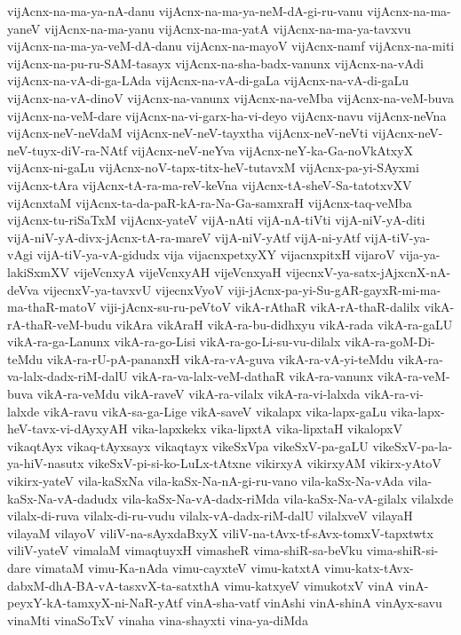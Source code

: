 {vijAcnx-na-ma-ya-nA-danu
vijAcnx-na-ma-ya-neM-dA-gi-ru-vanu
vijAcnx-na-ma-yaneV
vijAcnx-na-ma-yanu
vijAcnx-na-ma-yatA
vijAcnx-na-ma-ya-tavxvu
vijAcnx-na-ma-ya-veM-dA-danu
vijAcnx-na-mayoV
vijAcnx-namf
vijAcnx-na-miti
vijAcnx-na-pu-ru-SAM-tasayx
vijAcnx-na-sha-badx-vanunx
vijAcnx-na-vAdi
vijAcnx-na-vA-di-ga-LAda
vijAcnx-na-vA-di-gaLa
vijAcnx-na-vA-di-gaLu
vijAcnx-na-vA-dinoV
vijAcnx-na-vanunx
vijAcnx-na-veMba
vijAcnx-na-veM-buva
vijAcnx-na-veM-dare
vijAcnx-na-vi-garx-ha-vi-deyo
vijAcnx-navu
vijAcnx-neVna
vijAcnx-neV-neVdaM
vijAcnx-neV-neV-tayxtha
vijAcnx-neV-neVti
vijAcnx-neV-neV-tuyx-diV-ra-NAtf
vijAcnx-neV-neYva
vijAcnx-neY-ka-Ga-noVkAtxyX
vijAcnx-ni-gaLu
vijAcnx-noV-tapx-titx-heV-tutavxM
vijAcnx-pa-yi-SAyxmi
vijAcnx-tAra
vijAcnx-tA-ra-ma-reV-keVna
vijAcnx-tA-sheV-Sa-tatotxvXV
vijAcnxtaM
vijAcnx-ta-da-paR-kA-ra-Na-Ga-samxraH
vijAcnx-taq-veMba
vijAcnx-tu-riSaTxM
vijAcnx-yateV
vijA-nAti
vijA-nA-tiVti
vijA-niV-yA-diti
vijA-niV-yA-divx-jAcnx-tA-ra-mareV
vijA-niV-yAtf
vijA-ni-yAtf
vijA-tiV-ya-vAgi
vijA-tiV-ya-vA-gidudx
vija
vijacnxpetxyXY
vijacnxpitxH
vijaroV
vija-ya-lakiSxmXV
vijeVcnxyA
vijeVcnxyAH
vijeVcnxyaH
vijecnxV-ya-satx-jAjxcnX-nA-deVva
vijecnxV-ya-tavxvU
vijecnxVyoV
viji-jAcnx-pa-yi-Su-gAR-gayxR-mi-ma-ma-thaR-matoV
viji-jAcnx-su-ru-peVtoV
vikA-rAthaR
vikA-rA-thaR-dalilx
vikA-rA-thaR-veM-budu
vikAra
vikAraH
vikA-ra-bu-didhxyu
vikA-rada
vikA-ra-gaLU
vikA-ra-ga-Lanunx
vikA-ra-go-Lisi
vikA-ra-go-Li-su-vu-dilalx
vikA-ra-goM-Di-teMdu
vikA-ra-rU-pA-pananxH
vikA-ra-vA-guva
vikA-ra-vA-yi-teMdu
vikA-ra-va-lalx-dadx-riM-dalU
vikA-ra-va-lalx-veM-dathaR
vikA-ra-vanunx
vikA-ra-veM-buva
vikA-ra-veMdu
vikA-raveV
vikA-ra-vilalx
vikA-ra-vi-lalxda
vikA-ra-vi-lalxde
vikA-ravu
vikA-sa-ga-Lige
vikA-saveV
vikalapx
vika-lapx-gaLu
vika-lapx-heV-tavx-vi-dAyxyAH
vika-lapxkekx
vika-lipxtA
vika-lipxtaH
vikalopxV
vikaqtAyx
vikaq-tAyxsayx
vikaqtayx
vikeSxVpa
vikeSxV-pa-gaLU
vikeSxV-pa-la-ya-hiV-nasutx
vikeSxV-pi-si-ko-LuLx-tAtxne
vikirxyA
vikirxyAM
vikirx-yAtoV
vikirx-yateV
vila-kaSxNa
vila-kaSx-Na-nA-gi-ru-vano
vila-kaSx-Na-vAda
vila-kaSx-Na-vA-dadudx
vila-kaSx-Na-vA-dadx-riMda
vila-kaSx-Na-vA-gilalx
vilalxde
vilalx-di-ruva
vilalx-di-ru-vudu
vilalx-vA-dadx-riM-dalU
vilalxveV
vilayaH
vilayaM
vilayoV
viliV-na-sAyxdaBxyX
viliV-na-tAvx-tf-sAvx-tomxV-tapxtwtx
viliV-yateV
vimalaM
vimaqtuyxH
vimasheR
vima-shiR-sa-beVku
vima-shiR-si-dare
vimataM
vimu-Ka-nAda
vimu-cayxteV
vimu-katxtA
vimu-katx-tAvx-dabxM-dhA-BA-vA-tasxvX-ta-satxthA
vimu-katxyeV
vimukotxV
vinA
vinA-peyxY-kA-tamxyX-ni-NaR-yAtf
vinA-sha-vatf
vinAshi
vinA-shinA
vinAyx-savu
vinaMti
vinaSoTxV
vinaha
vina-shayxti
vina-ya-diMda
}

